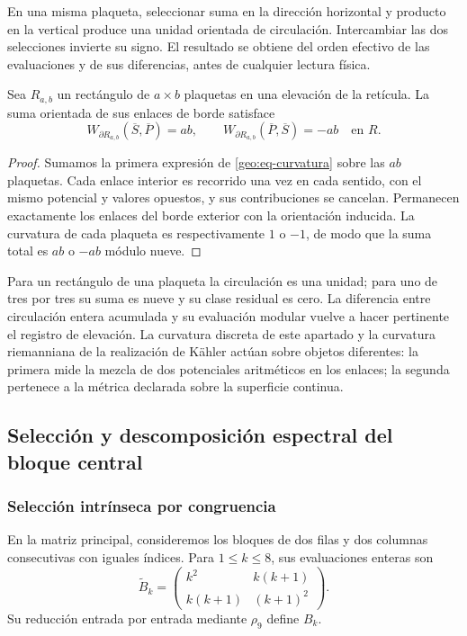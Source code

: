En una misma plaqueta, seleccionar suma en la dirección horizontal y producto en la vertical produce una unidad orientada de circulación. Intercambiar las dos selecciones invierte su signo. El resultado se obtiene del orden efectivo de las evaluaciones y de sus diferencias, antes de cualquier lectura física.

\begin{teorema}
\label{geo:thm-stokes}
Sea $R_{a,b}$ un rectángulo de $a\times b$ plaquetas en una elevación de la retícula. La suma orientada de sus enlaces de borde satisface
\[
 W_{\partial R_{a,b}}(\overline S,\overline P)=ab,
 \qquad
 W_{\partial R_{a,b}}(\overline P,\overline S)=-ab
 \quad\text{en }R.
\]
\end{teorema}

\begin{proof}
Sumamos la primera expresión de \eqref{geo:eq-curvatura} sobre las $ab$ plaquetas. Cada enlace interior es recorrido una vez en cada sentido, con el mismo potencial y valores opuestos, y sus contribuciones se cancelan. Permanecen exactamente los enlaces del borde exterior con la orientación inducida. La curvatura de cada plaqueta es respectivamente $1$ o $-1$, de modo que la suma total es $ab$ o $-ab$ módulo nueve.
\end{proof}

Para un rectángulo de una plaqueta la circulación es una unidad; para uno de tres por tres su suma es nueve y su clase residual es cero. La diferencia entre circulación entera acumulada y su evaluación modular vuelve a hacer pertinente el registro de elevación. La curvatura discreta de este apartado y la curvatura riemanniana de la realización de Kähler actúan sobre objetos diferentes: la primera mide la mezcla de dos potenciales aritméticos en los enlaces; la segunda pertenece a la métrica declarada sobre la superficie continua.

\subsection{Selección y descomposición espectral del bloque central}
\label{geo:bloque-central}

\subsubsection{Selección intrínseca por congruencia}

En la matriz principal, consideremos los bloques de dos filas y dos columnas consecutivas con iguales índices. Para $1\leq k\leq8$, sus evaluaciones enteras son
\[
 \widetilde B_k=
 \begin{pmatrix}k^2&k(k+1)\\k(k+1)&(k+1)^2\end{pmatrix}.
\]
Su reducción entrada por entrada mediante $\rho_9$ define $B_k$.

